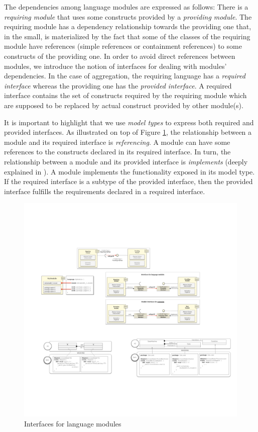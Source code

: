The dependencies among language modules are expressed as follows: There is a \textit{requiring module} that uses some constructs provided by a \textit{providing module}. The requiring module has a dependency relationship towards the providing one that, in the small, is materialized by the fact that some of the classes of the requiring module have references (simple references or containment references) to some constructs of the providing one. In order to avoid direct references between modules, we introduce the notion of interfaces for dealing with modules' dependencies. In the case of aggregation, the requiring language has a \textit{required interface} whereas the providing one has the \textit{provided interface}. A required interface contains the set of constructs required by the requiring module which are supposed to be replaced by actual construct provided by other module(s).

It is important to highlight that we use \textit{model types} \cite{Steel:2007} to express both required and provided interfaces. As illustrated on top of Figure \ref{fig:approaches-interfaces}, the relationship between a module and its required interface is \textit{referencing}. A module can have some references to the constructs declared in its required interface. In turn, the relationship between a module and its provided interface is \textit{implements} (deeply explained in \cite{Degueule:2015}). A module implements the functionality exposed in its model type. If the required interface is a subtype of the provided interface, then the provided interface fulfills the requirements declared in a required interface. 

\begin{figure}
\centering
\includegraphics[width=1\linewidth]{images/approach-interfaces.pdf}
\caption{Interfaces for language modules}
\label{fig:approaches-interfaces}
\end{figure}

